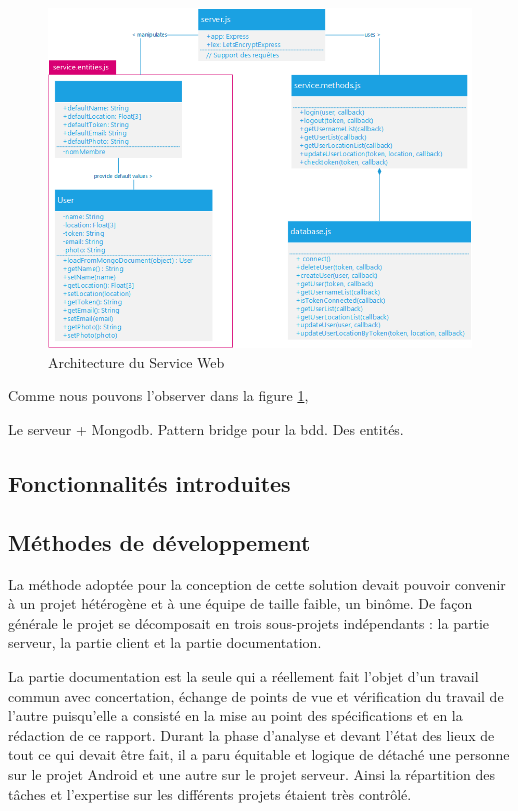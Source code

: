             \begin{figure}[H]
                \centering
                \includegraphics[width=\textwidth]{./img/architecture-service-web.png}
                \caption{Architecture du Service Web}
                \label{asweb}
            \end{figure}

            Comme nous pouvons l'observer dans la figure \ref{asweb}, 


            Le serveur + Mongodb.
            Pattern bridge pour la bdd. Des entités.

    \subsection{Fonctionnalités introduites}

    

    \subsection{Méthodes de développement}

    La méthode adoptée pour la conception de cette solution devait pouvoir convenir à un projet hétérogène et à une équipe de taille faible, un binôme. De façon générale le projet se décomposait en trois sous-projets indépendants : la partie serveur, la partie client et la partie documentation.

    La partie documentation est la seule qui a réellement fait l’objet d’un travail commun avec concertation, échange de points de vue et vérification du travail de l’autre puisqu’elle a consisté en la mise au point des spécifications et en la rédaction de ce rapport. Durant la phase d’analyse et devant l’état des lieux de tout ce qui devait être fait, il a paru équitable et logique de détaché une personne sur le projet Android et une autre sur le projet serveur. Ainsi la répartition des tâches et l’expertise sur les différents projets étaient très contrôlé.

